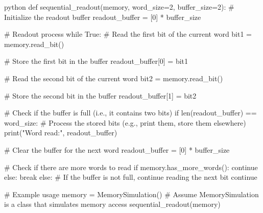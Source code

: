 python
def sequential_readout(memory, word_size=2, buffer_size=2):
    # Initialize the readout buffer
    readout_buffer = [0] * buffer_size
    
    # Readout process
    while True:
        # Read the first bit of the current word
        bit1 = memory.read_bit()
        
        # Store the first bit in the buffer
        readout_buffer[0] = bit1
        
        # Read the second bit of the current word
        bit2 = memory.read_bit()
        
        # Store the second bit in the buffer
        readout_buffer[1] = bit2
        
        # Check if the buffer is full (i.e., it contains two bits)
        if len(readout_buffer) == word_size:
            # Process the stored bits (e.g., print them, store them elsewhere)
            print("Word read:", readout_buffer)
            
            # Clear the buffer for the next word
            readout_buffer = [0] * buffer_size
            
            # Check if there are more words to read
            if memory.has_more_words():
                continue
            else:
                break
        else:
            # If the buffer is not full, continue reading the next bit
            continue

# Example usage
memory = MemorySimulation()  # Assume MemorySimulation is a class that simulates memory access
sequential_readout(memory)